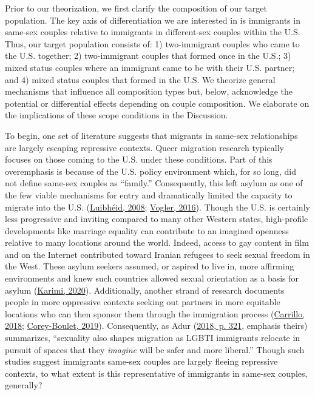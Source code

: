 \documentclass[
  11pt,
]{article}
\begin{document}
Prior to our theorization, we first clarify the composition of our target population. The key axis of differentiation we are interested in is immigrants in same-sex couples relative to immigrants in different-sex couples within the U.S. Thus, our target population consists of: 1) two-immigrant couples who came to the U.S. together; 2) two-immigrant couples that formed once in the U.S.; 3) mixed status couples where an immigrant came to be with their U.S. partner; and 4) mixed status couples that formed in the U.S. We theorize general mechanisms that influence all composition types but, below, acknowledge the potential or differential effects depending on couple composition. We elaborate on the implications of these scope conditions in the Discussion.

To begin, one set of literature suggests that migrants in same-sex relationships are largely escaping repressive contexts. Queer migration research typically focuses on those coming to the U.S. under these conditions. Part of this overemphasis is because of the U.S. policy environment which, for so long, did not define same-sex couples as ``family.'' Consequently, this left asylum as one of the few viable mechanisms for entry and dramatically limited the capacity to migrate into the U.S. (\protect\hyperlink{ref-luibheid_2008}{Luibhéid, 2008}; \protect\hyperlink{ref-vogler_2016}{Vogler, 2016}). Though the U.S. is certainly less progressive and inviting compared to many other Western states, high-profile developments like marriage equality can contribute to an imagined openness relative to many locations around the world. Indeed, access to gay content in film and on the Internet contributed toward Iranian refugees to seek sexual freedom in the West. These asylum seekers assumed, or aspired to live in, more affirming environments and knew such countries allowed sexual orientation as a basis for asylum (\protect\hyperlink{ref-karimi_2020}{Karimi, 2020}). Additionally, another strand of research documents people in more oppressive contexts seeking out partners in more equitable locations who can then sponsor them through the immigration process (\protect\hyperlink{ref-carrillo_2018}{Carrillo, 2018}; \protect\hyperlink{ref-corey-boulet_2019}{Corey-Boulet, 2019}). Consequently, as Adur (\protect\hyperlink{ref-adur_2018}{2018, p. 321}, emphasis theirs) summarizes, ``sexuality also shapes migration as LGBTI immigrants relocate in pursuit of spaces that they \emph{imagine} will be safer and more liberal.'' Though such studies suggest immigrants same-sex couples are largely fleeing repressive contexts, to what extent is this representative of immigrants in same-sex couples, generally?
\end{document}
